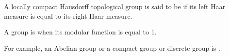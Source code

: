 \documentclass[12pt]{article}
\begin{document}
A locally compact Hausdorff topological group is said to be \emph{} if
its left Haar measure is equal to its right Haar measure.

A group is  when its modular function is equal to 1. 

For example, an Abelian group or a compact group or discrete group is .

\end{document}
